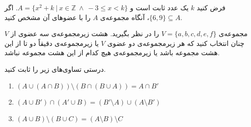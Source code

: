 \begin{problem} \label{seprkAx2+k}
	فرض کنید $k$ یک عدد ثابت است و
	$A=\{x^2+k \ | \ x \in \mathbb{Z} \ \wedge \ -3 \leq x < k\}$.
	اگر
	$\{6,9\} \subseteq A$،
	آنگاه مجموعه‌ی $A$ را با عضوهای آن مشخص کنید.
\end{problem}
\begin{problem} \label{seprsv8zm}
	مجموعه‌ی
	$V=\{a,b,c,d,e,f\}$
	را در نظر بگیرید. هشت زیرمجموعه‌ی سه عضوی از $V$ چنان انتخاب کنید که هر زیرمجموعه‌ی دو عضوی $V$ یا زیرمجموعه‌ی دقیقاً دو تا از این هشت مجموعه باشد یا زیرمجموعه‌ی هیچ کدام از این هشت مجموعه نباشد.
\end{problem}
\begin{problem} \label{seprprjmsetminus}
	درستی تساوی‌های زیر را ثابت کنید.
	\begin{enumerate}
		\item 
		$(A \cup (A \cap B)) \setminus (B \cap (B \cup A)) = A \cap B'$
		\item 
		$(A \cup B') \cap (A' \cup B) = (B' \setminus A) \cup (A \setminus B')$
		\item 
		$(A \cup B) \setminus (B \cup C) = (A \setminus B) \setminus C$
	\end{enumerate}
\end{problem}
